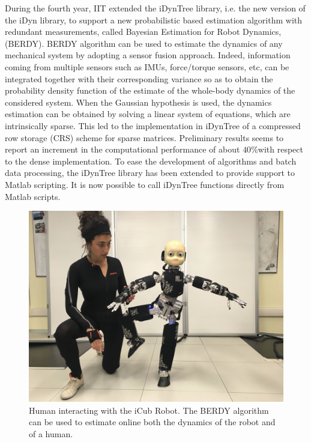 During the fourth year, IIT extended the iDynTree library, i.e. the new
version of the iDyn library, to support a new probabilistic based estimation
algorithm with redundant measurements, called Bayesian Estimation for Robot
Dynamics, (BERDY).  BERDY algorithm can be used to estimate the dynamics of
any mechanical system by adopting a sensor fusion approach.  Indeed,
information coming from multiple sensors such as IMUs, force/torque sensors,
etc, can be integrated together with their corresponding variance so as to
obtain the probability density function of the estimate of the whole-body
dynamics of the considered system.  When the Gaussian hypothesis is used, the
dynamics estimation can be obtained by solving a linear system of equations,
which are intrinsically sparse.  This led to the implementation in iDynTree of
a compressed row storage (CRS) scheme for sparse matrices.  Preliminary
results seems to report an increment in the computational performance of about
$40\%$with respect to the dense implementation.  To ease the development of
algorithms and batch data processing, the iDynTree library has been extended
to provide support to Matlab scripting.  It is now possible to call iDynTree
functions directly from Matlab scripts.
%
\begin{figure} 
  \centering
    \includegraphics[width=.9\textwidth]{images/suit.jpg}
  \caption{Human interacting with the iCub Robot. The BERDY algorithm can be used to estimate online both the dynamics of the robot and of a human.}
  \label{fig:images_suit}
\end{figure}
%


